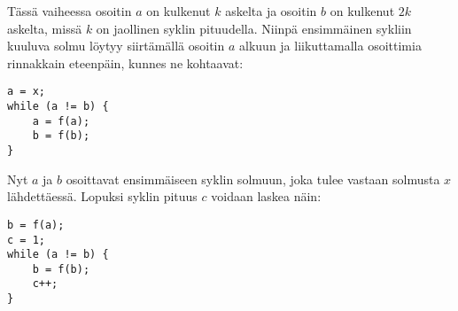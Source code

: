 Tässä vaiheessa osoitin $a$ on kulkenut $k$ askelta
ja osoitin $b$ on kulkenut $2k$ askelta,
missä $k$ on jaollinen syklin pituudella.
Niinpä ensimmäinen sykliin kuuluva solmu löytyy siirtämällä
osoitin $a$ alkuun ja liikuttamalla osoittimia
rinnakkain eteenpäin, kunnes ne kohtaavat:

\begin{lstlisting}
a = x;
while (a != b) {
    a = f(a);
    b = f(b);
}
\end{lstlisting}

Nyt $a$ ja $b$ osoittavat ensimmäiseen syklin
solmuun, joka tulee vastaan solmusta $x$ lähdettäessä.
Lopuksi syklin pituus $c$ voidaan laskea näin:

\begin{lstlisting}
b = f(a);
c = 1;
while (a != b) {
    b = f(b);
    c++;
}
\end{lstlisting}
% 
% 
% 
% 
% 
% 
% 
% 

